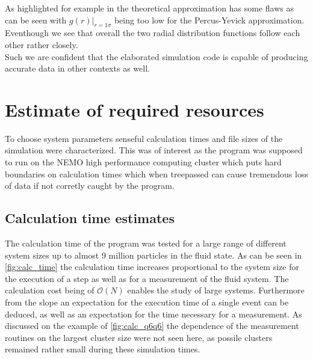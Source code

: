 As highlighted for example in \cite{Hansen2006} the theoretical approximation has some flaws as can be seen with $g(r)|_{r=1\sigma}$ being too low for the Percus-Yevick approximation. Eventhough we see that overall the two radial distribution functions follow each other rather closely.\\
Such we are confident that the elaborated simulation code is capable of producing accurate data in other contexts as well.\\


\section{Estimate of required resources}
\label{sec:resources}
To choose system parameters senseful calculation times and file sizes of the simulation were characterized. This was of interest as the program was supposed to run on the NEMO high performance computing cluster which puts hard boundaries on calculation times which when treepassed can cause tremendous loss of data if not corretly caught by the program.\\
 
\subsection{Calculation time estimates}
\label{sec:calc_times}
The calculation time of the program was tested for a large range of different system sizes up to almost 9 million particles in the fluid state. As can be seen in \autoref{fig:calc_time} the calculation time increases proportional to the system size for the execution of a step as well as for a measurement of the fluid system. The calculation cost being of $\mathcal{O}(N)$ enables the study of large systems. Furthermore from the slope an expectation for the execution time of a single event can be deduced, as well as an expectation for the time necessary for a measurement. As discussed on the example of \autoref{fig:calc_q6q6} the dependence of the measurement routines on the largest cluster size were not seen here, as possile clusters remained rather small during these simulation times.\\

